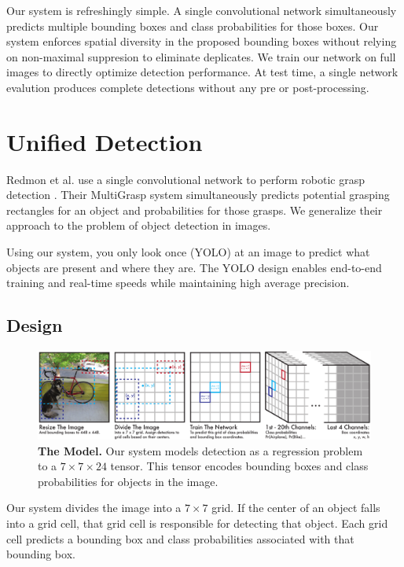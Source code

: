 \documentclass{article} %
\begin{document}
Our system is refreshingly simple. A single convolutional network simultaneously predicts multiple bounding boxes and class probabilities for those boxes. Our system enforces spatial diversity in the proposed bounding boxes without relying on non-maximal suppresion to eliminate deplicates. We train our network on full images to directly optimize detection performance. At test time, a single network evalution produces complete detections without any pre or post-processing.

\section{Unified Detection}

Redmon et al. use a single convolutional network to perform robotic grasp detection \cite{DBLP:journals/corr/RedmonA14}. Their MultiGrasp system simultaneously predicts potential grasping rectangles for an object and probabilities for those grasps. We generalize their approach to the problem of object detection in images.

Using our system, you only look once (YOLO) at an image to predict what objects are present and where they are. The YOLO design enables end-to-end training and real-time speeds while maintaining high average precision.

\subsection{Design}

\begin{figure}[t]
\begin{center}
        \includegraphics[width=\linewidth]{full}
\end{center}
   \caption{\textbf{The Model.} Our system models detection as a regression problem to a $7 \times 7 \times 24$ tensor. This tensor encodes bounding boxes and class probabilities for objects in the image.}
\label{model}
\end{figure}


Our system divides the image into a $7 \times 7$ grid. If the center of an object falls into a grid cell, that grid cell is responsible for detecting that object. Each grid cell predicts a bounding box and class probabilities associated with that bounding box.
\end{document}
